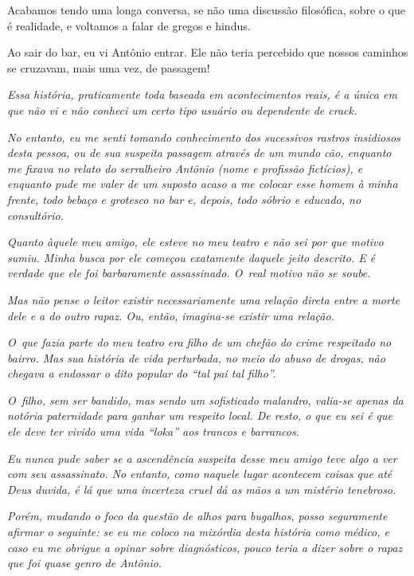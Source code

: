 Acabamos tendo uma longa conversa, se não uma discussão filosófica, sobre
o que é realidade, e voltamos a falar de gregos e hindus.

Ao sair do bar, eu vi Antônio entrar. Ele não teria percebido que nossos
caminhos se cruzavam, mais uma vez, de passagem!

\begin{center}\asterisc{}\end{center}
\begingroup\small

\emph{Essa história, praticamente toda baseada em acontecimentos reais, é a
única em que não vi e não conheci um certo tipo usuário ou dependente de
crack.}

\emph{No entanto, eu me senti tomando conhecimento dos sucessivos
rastros insidiosos desta pessoa, ou de sua suspeita passagem através de
um mundo cão, enquanto me fixava no relato do serralheiro Antônio (nome
e profissão fictícios), e enquanto pude me valer de um suposto acaso a
me colocar esse homem à minha frente, todo bebaço e grotesco no bar e,
depois, todo sóbrio e educado, no consultório.}

\emph{Quanto àquele meu amigo, ele esteve no meu teatro e não sei por
que motivo sumiu. Minha busca por ele começou exatamente daquele jeito
descrito. E é verdade que ele foi barbaramente assassinado. O~real
motivo não se soube.}

\emph{Mas não pense o leitor existir necessariamente uma relação direta
entre a morte dele e a do outro rapaz. Ou, então, imagina-se existir uma
relação.}

\emph{O~que fazia parte do meu teatro era filho de um chefão do crime
respeitado no bairro. Mas sua história de vida perturbada, no meio do
abuso de drogas, não chegava a endossar o dito popular do ``tal pai tal
filho''.}

\emph{O~filho, sem ser bandido, mas sendo um sofisticado malandro,
valia-se apenas da notória paternidade para ganhar um respeito local. De
resto, o que eu sei é que ele deve ter vivido uma vida ``loka'' aos
trancos e barrancos.}

\emph{Eu nunca pude saber se a ascendência suspeita desse meu amigo teve
algo a ver com seu assassinato. No entanto, como naquele lugar acontecem
coisas que até Deus duvida, é lá que uma incerteza cruel dá as mãos a um
mistério tenebroso.}

\emph{Porém, mudando o foco da questão de alhos para bugalhos, posso
seguramente afirmar o seguinte: se eu me coloco na mixórdia desta
história como médico, e caso eu me obrigue a opinar sobre diagnósticos,
pouco teria a dizer sobre o rapaz que foi quase genro de Antônio.}

